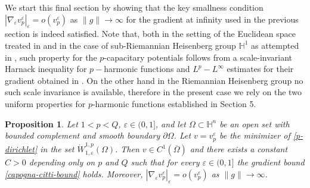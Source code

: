\documentclass[10pt]{amsart}
\numberwithin{equation}{section}
\newtheorem{proposition}[theorem]{Proposition}
\theoremstyle{definition}
\newcommand{\He}{\mathbb{H}}
\begin{document}
 

We start this final section by showing that the key smallness condition $|\nabla_\varepsilon v^\varepsilon_p |_\varepsilon=o(v_p^\varepsilon)$ as $\| g\| \to \infty$ for the gradient at infinity used in the previous section is indeed satisfied. Note that, both in the setting of the Euclidean space treated in \cite{Moser} and in the case of sub-Riemannian Heisenberg group $\He^1$ as attempted in \cite{CuiZhao}, such property for the $p$-capacitary potentials follows from a scale-invariant Harnack inequality for $p-$harmonic functions and $L^p-L^\infty$ estimates for their gradient obtained in \cite{Zhong}. On the other hand in the Riemannian Heisenberg group no such scale invariance is available, therefore in the present case we rely on the two uniform properties for $p$-harmonic functions established in Section 5. 




\begin{proposition}
\label{domain-convergence}
Let  $1<p<Q$, $\varepsilon \in (0,1]$, and let $\Omega \subset \He^n$ be an open set with bounded complement and smooth boundary $\partial \Omega$. Let $v=v^\varepsilon_p$ be the minimizer of \eqref{p-dirichlet} in the set $\dot{W}
^{1,p}_{1, \varepsilon} (\Omega)$. 
Then $v\in C^1(\overline{\Omega})$ and  there exists a constant $C>0$ depending only on $p$ and $Q$ such that for every $\varepsilon \in (0,1]$ the gradient bound \eqref{capogna-citti-bound} holds. Moreover,  $|\nabla_\varepsilon  v_p^\varepsilon|_\varepsilon=o(v_p^\varepsilon)$ as $\| g\| \to \infty$.
\end{proposition}
\end{document}
